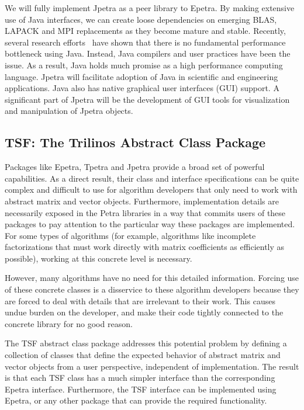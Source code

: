 \documentclass[12pt,relax]{SANDreport}
\begin{document}
We will fully implement Jpetra as a peer library to Epetra.  By making extensive use of Java
interfaces, we can create loose dependencies on emerging BLAS, LAPACK and MPI replacements as
they become mature and stable.  Recently, several research
efforts~\cite{MoreMidkGuptArtiWuAlma2001,SCIMARK-site}
have shown that there is no fundamental performance bottleneck using Java.  Instead, Java
compilers and user practices have been the issue.  As a result, Java holds much promise as a
high performance computing language.  Jpetra will facilitate adoption of Java in scientific and
engineering applications.   Java also has native graphical user interfaces (GUI) support.  A
significant part of Jpetra will be the development of GUI tools for visualization and
manipulation of Jpetra objects.


\subsection{TSF: The Trilinos Abstract Class Package}

Packages like Epetra, Tpetra and Jpetra provide a broad set of powerful 
capabilities.  As a direct
result, their class and interface specifications can be quite complex and difficult to use
for algorithm developers that only need to work with abstract matrix and vector objects.
Furthermore, implementation details are necessarily exposed in the Petra libraries
in a way that commits users
of these packages to pay attention to the particular way these packages are implemented.
For some types of algorithms (for example, algorithms like incomplete factorizations that 
must work directly with matrix coefficients as efficiently as possible), working at this
concrete level is necessary.  

However, many algorithms have no need for this detailed
information.  Forcing use of these concrete classes is a disservice to these algorithm
developers because they are forced to deal with details that are irrelevant to their work.
This causes undue burden on the developer, and make their code tightly connected to the 
concrete library for no good reason.

The TSF abstract class package addresses this potential problem by defining a collection 
of classes that define the expected behavior of abstract matrix and vector objects from a
user perspective, independent of implementation.  The result is that each TSF class has
a much simpler interface than the corresponding Epetra interface.  Furthermore, the TSF
interface can be implemented using Epetra, or any other package that can provide the 
required functionality.
\end{document}

